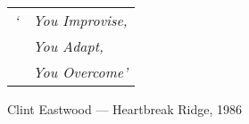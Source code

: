 \chapter[Quotes]{}



\hspace{0pt}
\vspace{34mm}
\begin{center}
\addtolength{\tabcolsep}{-6.6pt} 
\begin{tabular}{rl}
  \Large{\textit{`}} & \Large{\textit{You Improvise,}} \\
    & \Large{\textit{You Adapt,}} \\
    & \Large{\textit{You Overcome'}} \\
\end{tabular}
\addtolength{\tabcolsep}{6.6pt}
\end{center}
\vspace{1pt}
\begin{center}
\normalsize{Clint Eastwood --- Heartbreak Ridge, 1986}
\end{center}
\vfill
\hspace{0pt}
